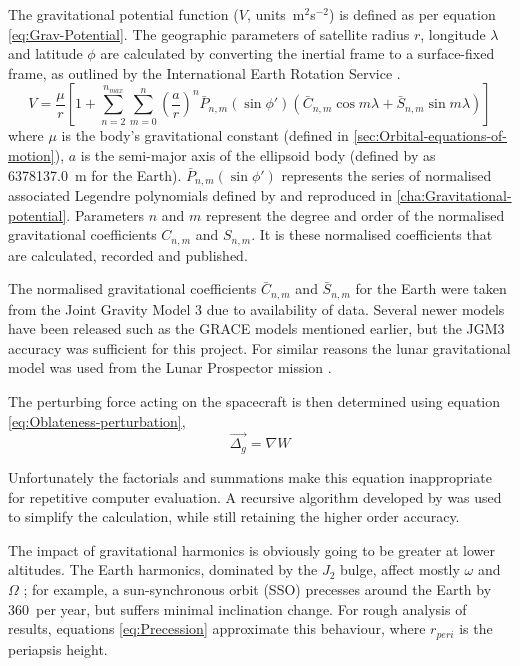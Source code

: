 The gravitational potential function ($V$, units~m$^{2}$s$^{-2}$) is defined as per equation \eqref{eq:Grav-Potential}. The geographic parameters of satellite radius $r$, longitude $\lambda$ and latitude $\phi$ are calculated by converting the inertial frame to a surface-fixed frame, as outlined by the International Earth Rotation Service \parencite{Petit2010}.
\begin{equation} \label{eq:Grav-Potential}
V=\frac{\mu}{r}\left[1+\sum_{n=2}^{n_{max}}\sum_{m=0}^{n}\left(\frac{a}{r}\right)^{n}\bar{P}_{n,m}\left(\sin\phi'\right)\left(\bar{C}_{n,m}\cos m\lambda+\bar{S}_{n,m}\sin m\lambda\right)\right]
\end{equation}
where $\mu$ is the body's gravitational constant (defined in \autoref{sec:Orbital-equations-of-motion}), $a$ is the semi-major axis of the ellipsoid body (defined by \citeauthor{WGS84} as 6378137.0~m for the Earth). $\bar{P}_{n,m}\left(\sin\phi'\right)$ represents the series of normalised associated Legendre polynomials defined by \textcite{WGS84} and reproduced in \autoref{cha:Gravitational-potential}. Parameters $n$ and $m$ represent the degree and order of the normalised gravitational coefficients $C_{n,m}$ and $S_{n,m}$. It is these normalised coefficients that are calculated, recorded and published. 

The normalised gravitational coefficients $\bar{C}_{n,m}$ and $\bar{S}_{n,m}$ for the Earth were taken from the Joint Gravity Model 3 \parencite[JGM3,][]{Tapley1996} due to availability of data. Several newer models have been released such as the GRACE models mentioned earlier, but the JGM3 accuracy was sufficient for this project. For similar reasons the lunar gravitational model was used from the Lunar Prospector mission \parencite[LP165, ][]{Konopliv2001}.

The perturbing force acting on the spacecraft is then determined using equation \eqref{eq:Oblateness-perturbation},
\begin{equation}\label{eq:Oblateness-perturbation}
\vec{\Delta_g}=\nabla W
\end{equation}

Unfortunately the factorials and summations make this equation inappropriate for repetitive computer evaluation. A recursive algorithm developed by \textcite{Montenbruck2000} was used to simplify the calculation, while still retaining the higher order accuracy. 

The impact of gravitational harmonics is obviously going to be greater at lower altitudes. The Earth harmonics, dominated by the $J_2$ bulge, affect mostly $\omega$ and $\Omega$ \parencite{Montenbruck2000,Eshagh2007}; for example, a sun-synchronous orbit (SSO) precesses around the Earth by 360\degrees\ per year, but suffers minimal inclination change. For rough analysis of results, equations \eqref{eq:Precession} approximate this behaviour, where $r_{peri}$ is the periapsis height.

